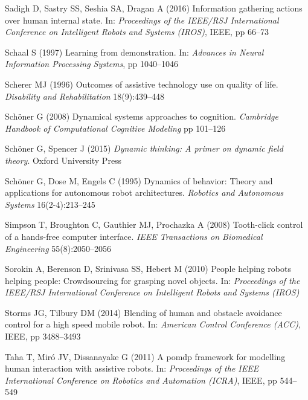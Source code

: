 \documentclass[natbib, twocolumn]{svjour3}          %
\begin{document}
\begin{thebibliography}{54}
	Sadigh D, Sastry SS, Seshia SA, Dragan A (2016{}) Information
	gathering actions over human internal state. In: \textit{Proceedings of the
		IEEE/RSJ International Conference on Intelligent Robots and Systems (IROS)},
	IEEE, pp 66--73
	
	Schaal S (1997) Learning from demonstration. In: \textit{Advances in Neural
		Information Processing Systems}, pp 1040--1046
	
	Scherer MJ (1996) Outcomes of assistive technology use on quality of life.
	\textit{Disability and Rehabilitation} 18(9):439--448
	
	Sch{\"o}ner G (2008) Dynamical systems approaches to cognition.
	\textit{Cambridge Handbook of Computational Cognitive Modeling} pp 101--126
	
	Sch{\"o}ner G, Spencer J (2015) \textit{Dynamic thinking: A primer on dynamic
		field theory}. Oxford University Press
	
	Sch{\"o}ner G, Dose M, Engels C (1995) Dynamics of behavior: Theory and
	applications for autonomous robot architectures. \textit{Robotics and
		Autonomous Systems} 16(2-4):213--245
	
	Simpson T, Broughton C, Gauthier MJ, Prochazka A (2008) Tooth-click control of a hands-free computer interface. \textit{IEEE Transactions on Biomedical Engineering} 55(8):2050--2056
	
	Sorokin A, Berenson D, Srinivasa SS, Hebert M (2010) People helping robots
	helping people: Crowdsourcing for grasping novel objects. In:
	\textit{Proceedings of the IEEE/RSJ International Conference on Intelligent
		Robots and Systems (IROS)}
	
	Storms JG, Tilbury DM (2014) Blending of human and obstacle avoidance control
	for a high speed mobile robot. In: \textit{American Control Conference
		(ACC)}, IEEE, pp 3488--3493
	
	Taha T, Mir{\'o} JV, Dissanayake G (2011) A pomdp framework for modelling human
	interaction with assistive robots. In: \textit{Proceedings of the IEEE
		International Conference on Robotics and Automation (ICRA)}, IEEE, pp
	544--549
	

\end{thebibliography}
\end{document}
